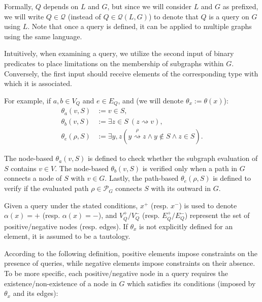 \documentclass{article}%
\begin{document}
Formally, $Q$ depends on $L$ and $G$, but since we will consider $L$ and $G$ as prefixed, we will write $Q \in \mathcal{Q} $ (instead of $Q \in \mathcal{Q}(L, G) $) to denote that $Q $ is a query on $G$ using $L $.  Note that once a query is defined, it can be applied to multiple graphs using the same language.

Intuitively, when examining a query, we utilize the second input of binary predicates to place limitations on the membership of subgraphs within $ G $. Conversely, the first input should receive elements of the corresponding type with which it is associated. 

For example, if $a,b\in V_Q$ and $e\in E_Q$, and (we will denote $\theta_x:=\theta(x)$):
\begin{align*}
\theta_a(v,S)&:=v\in S,\\
\theta_b(v,S)&:=\exists z\in S\ (z \stackrel{}{\rightsquigarrow} v),\\
\theta_e(\rho,S)&:=\exists y,z (y \stackrel{\rho}{\rightsquigarrow} z \wedge y \notin S\wedge z\in S).
\end{align*}

The node-based $\theta_a(v,S)$ is defined to check whether the subgraph evaluation of $S$ contains $v\in V$. The node-based $\theta_b(v,S)$ is verified only when a path in $G$ connects a node of $S$ with $v\in G$. Lastly, the path-based $\theta_e(\rho,S)$ is defined to verify if the evaluated path $\rho\in \mathcal{P}_G$ connects $S$ with its outward in $G$.

Given a query under the stated conditions, $x^+$ (resp. $x^-$) is used to denote $ \alpha (x) = + $ (resp. $ \alpha (x) = - $), and $V_Q^+/V_Q^-$ (resp. $E_Q^+/E_Q^-$) represent the set of positive/negative nodes (resp. edges). If $ \theta_x $ is not explicitly defined for an element, it is assumed to be a tautology.

According to the following definition, positive elements impose constraints on the presence of queries, while negative elements impose constraints on their absence. To be more specific, each positive/negative node in a query requires the existence/non-existence of a node in $G$ which satisfies its conditions (imposed by $\theta_x$ and its edges):
\end{document}
